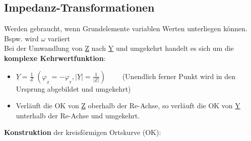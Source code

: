 \newpage

\subsection{Impedanz-Transformationen}
Werden gebraucht, wenn Grundelemente variablen Werten unterliegen können. Bspw. wird $\omega$ variiert\\
Bei der Umwandlung von \underline{Z} nach \underline{Y} und umgekehrt handelt es sich um die
\textbf{komplexe Kehrwertfunktion}: 
\begin{itemize}
  \item $\underline{Y} = \frac{1}{\underline{Z}} \;
  ( \varphi_{_Z} = -\varphi_{_Y},  
  |\underline{Y}| = \frac{1}{| \underline{Z} |}) \qquad$
  (Unendlich ferner Punkt wird in den Ursprung abgebildet und umgekehrt)
  \item Verläuft die OK von \underline{Z} oberhalb der Re-Achse, so verläuft die OK von
  \underline{Y} unterhalb der Re-Achse und umgekehrt.
\end{itemize} 
\textbf{Konstruktion} der kreisförmigen Ortskurve (OK):
